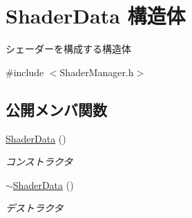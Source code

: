 \hypertarget{struct_d3_d11_1_1_graphic_1_1_shader_data}{}\section{Shader\+Data 構造体}
\label{struct_d3_d11_1_1_graphic_1_1_shader_data}


シェーダーを構成する構造体  




{\ttfamily \#include $<$Shader\+Manager.\+h$>$}

\subsection*{公開メンバ関数}
\begin{DoxyCompactItemize}
\item 
\hyperlink{struct_d3_d11_1_1_graphic_1_1_shader_data_ab6fb7f85f67d623e4b0cca0a39312851}{Shader\+Data} ()\hypertarget{struct_d3_d11_1_1_graphic_1_1_shader_data_ab6fb7f85f67d623e4b0cca0a39312851}{}\label{struct_d3_d11_1_1_graphic_1_1_shader_data_ab6fb7f85f67d623e4b0cca0a39312851}

\begin{DoxyCompactList}\small\item\em コンストラクタ \end{DoxyCompactList}\item 
\hyperlink{struct_d3_d11_1_1_graphic_1_1_shader_data_a0c021e76673bf827f6f610577171ac95}{$\sim$\+Shader\+Data} ()\hypertarget{struct_d3_d11_1_1_graphic_1_1_shader_data_a0c021e76673bf827f6f610577171ac95}{}\label{struct_d3_d11_1_1_graphic_1_1_shader_data_a0c021e76673bf827f6f610577171ac95}

\begin{DoxyCompactList}\small\item\em デストラクタ \end{DoxyCompactList}\end{DoxyCompactItemize}
